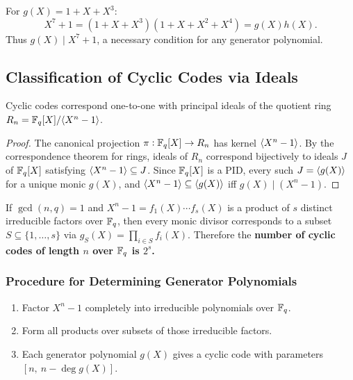 \begin{example}
For \(g(X)=1+X+X^3\):
\[X^7+1 = (1+X+X^3)(1+X+X^2+X^4)=g(X)h(X).\]
Thus \(g(X)\mid X^7+1\), a necessary condition for any generator polynomial.
\end{example}

\newpage
\subsection{Classification of Cyclic Codes via Ideals}

Cyclic codes correspond one-to-one with principal ideals of the quotient ring \(R_n = \mathbb{F}_q[X]/\langle X^n-1\rangle\).


\begin{proof}
The canonical projection \(\pi: \mathbb{F}_q[X] \to R_n\) has kernel \(\langle X^n-1\rangle\). By the correspondence theorem for rings, ideals of \(R_n\) correspond bijectively to ideals \(J\) of \(\mathbb{F}_q[X]\) satisfying \(\langle X^n-1\rangle\subseteq J\). Since \(\mathbb{F}_q[X]\) is a PID, every such \(J=\langle g(X)\rangle\) for a unique monic \(g(X)\), and \(\langle X^n-1\rangle\subseteq\langle g(X)\rangle\) iff \(g(X)\mid(X^n-1)\).
\end{proof}

\begin{remark}
If \(\gcd(n,q)=1\) and \(X^n-1=f_1(X)\cdots f_s(X)\) is a product of \(s\) distinct irreducible factors over \(\mathbb{F}_q\), then every monic divisor corresponds to a subset \(S\subseteq\{1,\dots,s\}\) via \(g_S(X)=\prod_{i\in S}f_i(X)\). Therefore the \textbf{number of cyclic codes of length \(n\) over \(\mathbb{F}_q\) is \(2^s\).}
\end{remark}

\subsubsection*{Procedure for Determining Generator Polynomials}
\begin{enumerate}[(1)]
	\item Factor \(X^n-1\) completely into irreducible polynomials over \(\mathbb{F}_q\).
	\item Form all products over subsets of those irreducible factors.
	\item Each generator polynomial \(g(X)\) gives a cyclic code with parameters \([n,\ n-\deg g(X)]\).
\end{enumerate}

